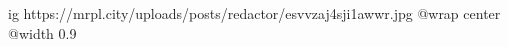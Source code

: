  
 
 
 
 

\ifcmt
  ig https://mrpl.city/uploads/posts/redactor/esvvzaj4sji1awwr.jpg
  @wrap center
  @width 0.9
\fi
